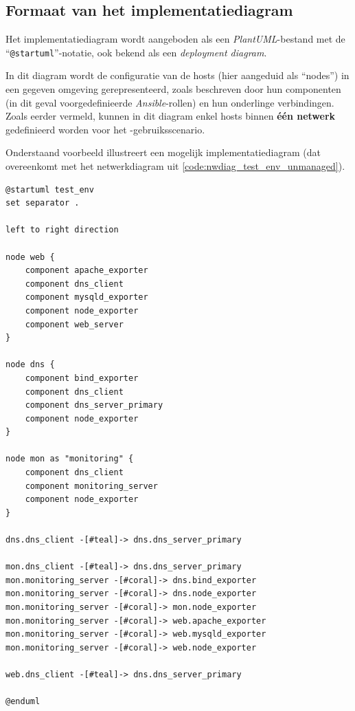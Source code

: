 \subsection{Formaat van het implementatiediagram}%
\label{subsec:formaat_uml}

Het implementatiediagram wordt aangeboden als een \emph{PlantUML}-bestand met de ``\texttt{@startuml}''-notatie, ook bekend als een \emph{deployment diagram}.

In dit diagram wordt de configuratie van de hosts (hier aangeduid als ``nodes'') in een gegeven omgeving gerepresenteerd, zoals beschreven door hun componenten (in dit geval voorgedefinieerde \emph{Ansible}-rollen) en hun onderlinge verbindingen. Zoals eerder vermeld, kunnen in dit diagram enkel hosts binnen \textbf{één netwerk} gedefinieerd worden voor het -gebruiksscenario.

Onderstaand voorbeeld illustreert een mogelijk implementatiediagram (dat overeenkomt met het netwerkdiagram uit \autoref{code:nwdiag_test_env_unmanaged}).

\begin{codeblock}
  \begin{lstlisting}[language=plantuml]
@startuml test_env
set separator .

left to right direction

node web {
    component apache_exporter
    component dns_client
    component mysqld_exporter
    component node_exporter
    component web_server
}

node dns {
    component bind_exporter
    component dns_client
    component dns_server_primary
    component node_exporter
}

node mon as "monitoring" {
    component dns_client
    component monitoring_server
    component node_exporter
}

dns.dns_client -[#teal]-> dns.dns_server_primary

mon.dns_client -[#teal]-> dns.dns_server_primary
mon.monitoring_server -[#coral]-> dns.bind_exporter
mon.monitoring_server -[#coral]-> dns.node_exporter
mon.monitoring_server -[#coral]-> mon.node_exporter
mon.monitoring_server -[#coral]-> web.apache_exporter
mon.monitoring_server -[#coral]-> web.mysqld_exporter
mon.monitoring_server -[#coral]-> web.node_exporter

web.dns_client -[#teal]-> dns.dns_server_primary

@enduml
\end{lstlisting}
  \caption[Tekstformaat voorbeeld implementatiediagram (\emph{PlantUML})]{Tekstformaat van het voorbeeld van een implementatiediagram in \emph{PlantUML}.}
  \label{code:uml_test_env}
\end{codeblock}

